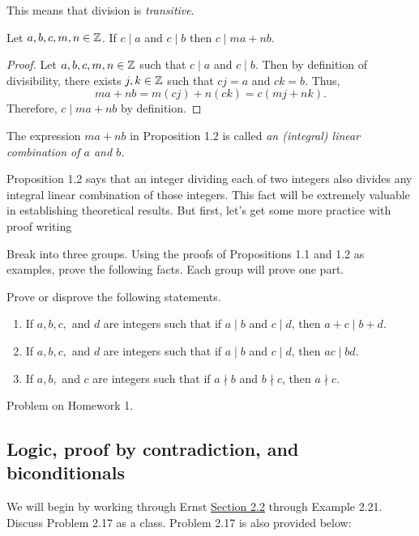 \documentclass{../ximera}
\begin{document}
This means that division is \emph{transitive}. 


\begin{proposition}
  Let $a,b,c,m,n\in\mathbb Z$.
  If $c\mid a$ and $c\mid b$ then $c\mid ma+nb$.

  \begin{proof}
    Let $a,b,c,m,n\in\mathbb Z$ such that $c\mid a$ and $c\mid b$. Then by definition of divisibility, there exists $j,k\in\mathbb Z$ such that $cj=a$ and $ck=b$. Thus, \[ma+nb=m(cj)+n(ck)=c(mj+nk).\] Therefore, $c\mid ma+nb$ by definition.
  \end{proof}
\end{proposition}

\begin{defn}
The expression $ma+nb$ in Proposition 1.2 is called \emph{an (integral) linear combination of $a$ and $b$.}
\end{defn}
Proposition 1.2 says that an integer dividing each of two integers also divides any integral linear combination of those integers. This fact will be extremely valuable in establishing theoretical results. But first, let's get some more practice with proof writing

Break into three groups. Using the proofs of Propositions 1.1 and 1.2 as examples, prove the following facts. Each group will prove one part.

\begin{br}\label{divisfacts}
Prove or disprove the following statements.
\begin{enumerate}[label=(\alph*)]
\item If $a,b,c,$ and $d$ are integers such that if $a\mid b$ and $c\mid d$, then $a+c\mid b+d$.
\item If $a,b,c,$ and $d$ are integers such that if $a\mid b$ and $c\mid d$, then $ac\mid bd$.
\item If $a,b,$ and $c$ are integers such that if $a\nmid b$ and $b\nmid c$, then $a\nmid c$.
\end{enumerate}
\end{br}
\begin{solution}
Problem on Homework 1.
\end{solution}

\subsection{Logic, proof by contradiction, and biconditionals} 

We will begin by working through Ernst \href{https://danaernst.com/IBL-IntroToProof/pretext/sec_Intro_to_Logic.html}{Section 2.2} through Example 2.21. Discuss Problem 2.17 as a class. Problem 2.17 is also provided below:
\end{document}
